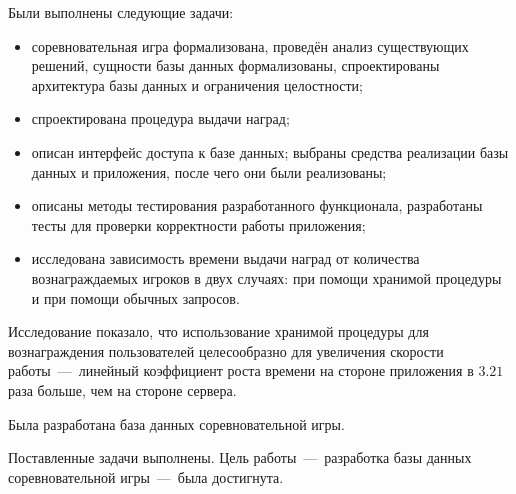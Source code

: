 
Были выполнены следующие задачи:
\begin{itemize}
	\item соревновательная игра формализована, проведён анализ существующих решений,
	сущности базы данных формализованы, спроектированы архитектура базы данных и ограничения целостности;
	\item спроектирована процедура выдачи наград;
	\item описан интерфейс доступа к базе данных; выбраны средства реализации базы данных и приложения, после чего они были реализованы;
	\item описаны методы тестирования разработанного функционала, разработаны тесты для проверки корректности работы приложения;
	\item исследована зависимость времени выдачи наград от количества вознаграждаемых игроков в двух случаях: при помощи хранимой процедуры и при помощи обычных запросов.
\end{itemize}

Исследование показало, что использование хранимой процедуры для вознаграждения пользователей целесообразно для увеличения скорости работы~---~линейный коэффициент роста времени на стороне приложения в $3.21$ раза больше, чем на стороне сервера.

Была разработана база данных соревновательной игры.

Поставленные задачи выполнены. Цель работы~---~разработка базы данных соревновательной игры~---~была достигнута.
